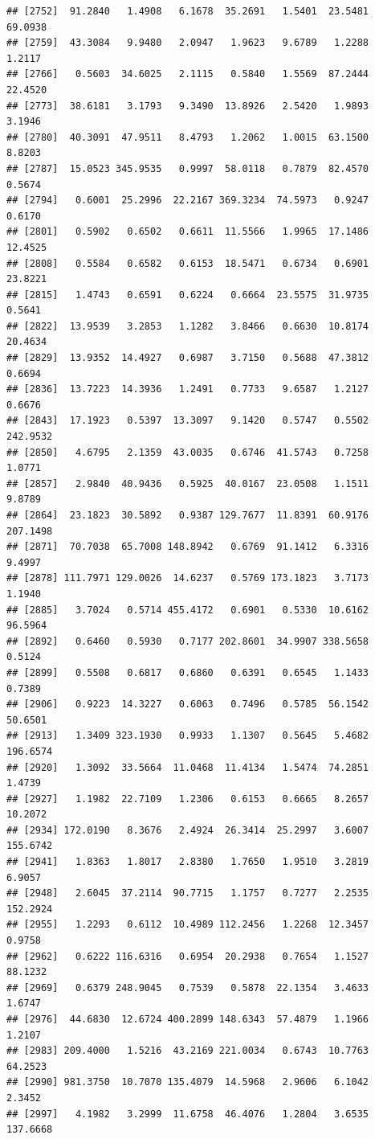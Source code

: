 \documentclass{article}\usepackage[]{graphicx}\usepackage[]{color}
\makeatletter
\newenvironment{kframe}{%
 \def\at@end@of@kframe{}%
 \ifinner\ifhmode%
  \def\at@end@of@kframe{\end{minipage}}%
  \begin{minipage}{\columnwidth}%
 \fi\fi%
 \def\FrameCommand##1{\hskip\@totalleftmargin \hskip-\fboxsep
 \colorbox{shadecolor}{##1}\hskip-\fboxsep
     \hskip-\linewidth \hskip-\@totalleftmargin \hskip\columnwidth}%
 \MakeFramed {\advance\hsize-\width
   \@totalleftmargin\z@ \linewidth\hsize
   \@setminipage}}%
 {\par\unskip\endMakeFramed%
 \at@end@of@kframe}
\newenvironment{knitrout}{}{} %
\makeatother
\begin{document}
\begin{knitrout}
\begin{kframe}
\begin{verbatim}
## [2752]  91.2840   1.4908   6.1678  35.2691   1.5401  23.5481  69.0938
## [2759]  43.3084   9.9480   2.0947   1.9623   9.6789   1.2288   1.2117
## [2766]   0.5603  34.6025   2.1115   0.5840   1.5569  87.2444  22.4520
## [2773]  38.6181   3.1793   9.3490  13.8926   2.5420   1.9893   3.1946
## [2780]  40.3091  47.9511   8.4793   1.2062   1.0015  63.1500   8.8203
## [2787]  15.0523 345.9535   0.9997  58.0118   0.7879  82.4570   0.5674
## [2794]   0.6001  25.2996  22.2167 369.3234  74.5973   0.9247   0.6170
## [2801]   0.5902   0.6502   0.6611  11.5566   1.9965  17.1486  12.4525
## [2808]   0.5584   0.6582   0.6153  18.5471   0.6734   0.6901  23.8221
## [2815]   1.4743   0.6591   0.6224   0.6664  23.5575  31.9735   0.5641
## [2822]  13.9539   3.2853   1.1282   3.8466   0.6630  10.8174  20.4634
## [2829]  13.9352  14.4927   0.6987   3.7150   0.5688  47.3812   0.6694
## [2836]  13.7223  14.3936   1.2491   0.7733   9.6587   1.2127   0.6676
## [2843]  17.1923   0.5397  13.3097   9.1420   0.5747   0.5502 242.9532
## [2850]   4.6795   2.1359  43.0035   0.6746  41.5743   0.7258   1.0771
## [2857]   2.9840  40.9436   0.5925  40.0167  23.0508   1.1511   9.8789
## [2864]  23.1823  30.5892   0.9387 129.7677  11.8391  60.9176 207.1498
## [2871]  70.7038  65.7008 148.8942   0.6769  91.1412   6.3316   9.4997
## [2878] 111.7971 129.0026  14.6237   0.5769 173.1823   3.7173   1.1940
## [2885]   3.7024   0.5714 455.4172   0.6901   0.5330  10.6162  96.5964
## [2892]   0.6460   0.5930   0.7177 202.8601  34.9907 338.5658   0.5124
## [2899]   0.5508   0.6817   0.6860   0.6391   0.6545   1.1433   0.7389
## [2906]   0.9223  14.3227   0.6063   0.7496   0.5785  56.1542  50.6501
## [2913]   1.3409 323.1930   0.9933   1.1307   0.5645   5.4682 196.6574
## [2920]   1.3092  33.5664  11.0468  11.4134   1.5474  74.2851   1.4739
## [2927]   1.1982  22.7109   1.2306   0.6153   0.6665   8.2657  10.2072
## [2934] 172.0190   8.3676   2.4924  26.3414  25.2997   3.6007 155.6742
## [2941]   1.8363   1.8017   2.8380   1.7650   1.9510   3.2819   6.9057
## [2948]   2.6045  37.2114  90.7715   1.1757   0.7277   2.2535 152.2924
## [2955]   1.2293   0.6112  10.4989 112.2456   1.2268  12.3457   0.9758
## [2962]   0.6222 116.6316   0.6954  20.2938   0.7654   1.1527  88.1232
## [2969]   0.6379 248.9045   0.7539   0.5878  22.1354   3.4633   1.6747
## [2976]  44.6830  12.6724 400.2899 148.6343  57.4879   1.1966   1.2107
## [2983] 209.4000   1.5216  43.2169 221.0034   0.6743  10.7763  64.2523
## [2990] 981.3750  10.7070 135.4079  14.5968   2.9606   6.1042   2.3452
## [2997]   4.1982   3.2999  11.6758  46.4076   1.2804   3.6535 137.6668

\end{verbatim}
\end{kframe}
\end{knitrout}
\end{document}
